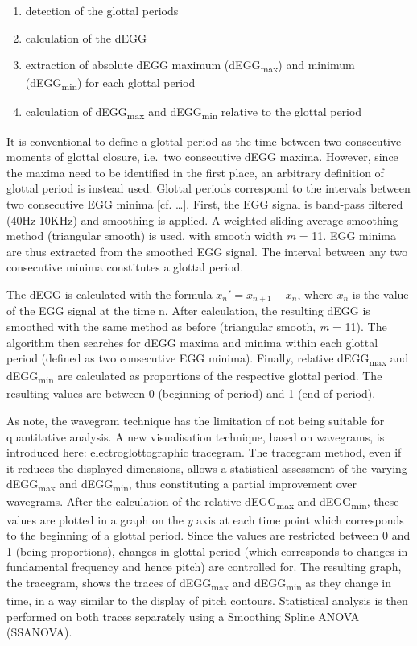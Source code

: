 \documentclass[11pt,A4paper,]{article}
\providecommand{\tightlist}{%
  \setlength{\itemsep}{0pt}\setlength{\parskip}{0pt}}
\begin{document}
\begin{enumerate}
\def\labelenumi{\arabic{enumi}.}
\tightlist
\item
  detection of the glottal periods
\item
  calculation of the dEGG
\item
  extraction of absolute dEGG maximum (dEGG\textsubscript{max}) and
  minimum (dEGG\textsubscript{min}) for each glottal period
\item
  calculation of dEGG\textsubscript{max} and dEGG\textsubscript{min}
  relative to the glottal period
\end{enumerate}

It is conventional to define a glottal period as the time between two
consecutive moments of glottal closure, i.e.~two consecutive dEGG
maxima. However, since the maxima need to be identified in the first
place, an arbitrary definition of glottal period is instead used.
Glottal periods correspond to the intervals between two consecutive EGG
minima {[}cf. \ldots{}{]}. First, the EGG signal is band-pass filtered
(40Hz-10KHz) and smoothing is applied. A weighted sliding-average
smoothing method (triangular smooth) is used, with smooth width \emph{m}
= 11. EGG minima are thus extracted from the smoothed EGG signal. The
interval between any two consecutive minima constitutes a glottal
period.

The dEGG is calculated with the formula \(x_n' = x_{n+1} - x_n\), where
\(x_n\) is the value of the EGG signal at the time n. After calculation,
the resulting dEGG is smoothed with the same method as before
(triangular smooth, \emph{m} = 11). The algorithm then searches for dEGG
maxima and minima within each glottal period (defined as two consecutive
EGG minima). Finally, relative dEGG\textsubscript{max} and
dEGG\textsubscript{min} are calculated as proportions of the respective
glottal period. The resulting values are between 0 (beginning of period)
and 1 (end of period).

As \citet{herbst2010} note, the wavegram technique has the limitation of
not being suitable for quantitative analysis. A new visualisation
technique, based on wavegrams, is introduced here: electroglottographic
tracegram. The tracegram method, even if it reduces the displayed
dimensions, allows a statistical assessment of the varying
dEGG\textsubscript{max} and dEGG\textsubscript{min}, thus constituting a
partial improvement over wavegrams. After the calculation of the
relative dEGG\textsubscript{max} and dEGG\textsubscript{min}, these
values are plotted in a graph on the \emph{y} axis at each time point
which corresponds to the beginning of a glottal period. Since the values
are restricted between 0 and 1 (being proportions), changes in glottal
period (which corresponds to changes in fundamental frequency and hence
pitch) are controlled for. The resulting graph, the tracegram, shows the
traces of dEGG\textsubscript{max} and dEGG\textsubscript{min} as they
change in time, in a way similar to the display of pitch contours.
Statistical analysis is then performed on both traces separately using a
Smoothing Spline ANOVA (SSANOVA).
\end{document}
